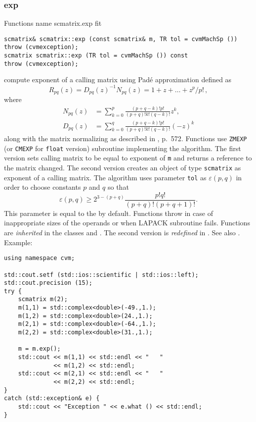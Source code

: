 \subsubsection{exp}
Functions%
\pdfdest name {scmatrix.exp} fit
\begin{verbatim}
scmatrix& scmatrix::exp (const scmatrix& m, TR tol = cvmMachSp ())
throw (cvmexception);
scmatrix scmatrix::exp (TR tol = cvmMachSp ()) const
throw (cvmexception);
\end{verbatim}
compute  exponent of a calling matrix using Pad\'e approximation
defined as
\begin{equation*}
R_{pq}(z)=D_{pq}(z)^{-1}N_{pq}(z)=1+z+\dots+z^p/p!\,,
\end{equation*}
where
\begin{align*}
N_{pq}(z)&=\sum_{k=0}^p\frac{(p+q-k)!p!}{(p+q)!k!(q-k)!}z^k,\\
D_{pq}(z)&=\sum_{k=0}^q\frac{(p+q-k)!p!}{(p+q)!k!(q-k)!}(-z)^k
\end{align*}
along with the matrix normalizing as described in
, p.~572.
Functions use \verb"ZMEXP" (or \verb"CMEXP" for \verb"float" version)
\FORTRAN subroutine implementing the algorithm.
The first version sets calling matrix to be equal to
 exponent of \verb"m" and returns a reference to the matrix
changed. The second version
creates an object of type \verb"scmatrix" as 
exponent of a calling matrix.
The algorithm uses parameter \verb"tol"
as $\varepsilon(p,q)$ in order to choose constants $p$ and $q$
so that
\begin{equation*}
\varepsilon(p,q)\ge 2^{3-(p+q)}\frac{p!q!}{(p+q)!(p+q+1)!}.
\end{equation*}
This parameter is equal to the
 by default.
Functions throw   
in case of
inappropriate sizes of the operands or when LAPACK subroutine fails.
Functions are \emph{inherited} in the classes
and . The second version
is \emph{redefined} in .
See also
.
Example:
\begin{Verbatim}
using namespace cvm;

std::cout.setf (std::ios::scientific | std::ios::left); 
std::cout.precision (15);
try {
    scmatrix m(2);
    m(1,1) = std::complex<double>(-49.,1.);
    m(1,2) = std::complex<double>(24.,1.);
    m(2,1) = std::complex<double>(-64.,1.);
    m(2,2) = std::complex<double>(31.,1.);

    m = m.exp();
    std::cout << m(1,1) << std::endl << "   " 
              << m(1,2) << std::endl;
    std::cout << m(2,1) << std::endl << "   " 
              << m(2,2) << std::endl;
}
catch (std::exception& e) {
    std::cout << "Exception " << e.what () << std::endl;
}
\end{Verbatim}
